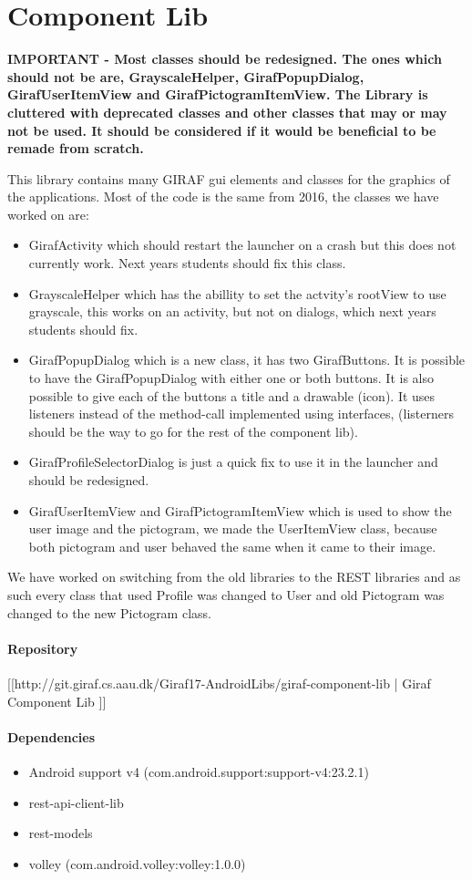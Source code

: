 \chapter{Component Lib}\label{WikiCompLib}
\textbf{IMPORTANT - Most classes should be redesigned. The ones which should not
be are, GrayscaleHelper, GirafPopupDialog, GirafUserItemView and
GirafPictogramItemView. The Library is cluttered with deprecated classes and
other classes that may or may not be used. It should be considered if it would
be beneficial to be remade from scratch.}

This library contains many GIRAF gui elements and classes for the graphics of
the applications. Most of the code is the same from 2016, the classes we have
worked on are:

\begin{itemize}
  \item GirafActivity which should restart the launcher on a crash but this
  does not currently work. Next years students should fix this class.
  \item GrayscaleHelper which has the abillity to set the actvity's rootView to
  use grayscale, this works on an activity, but not on dialogs,  which next
  years students should fix.
  \item GirafPopupDialog which is a new class, it has two GirafButtons. It is
  possible to have the GirafPopupDialog with either one or both buttons. It is
  also possible to give each of the buttons a title and a drawable (icon). It
  uses listeners instead of the method-call implemented using interfaces,
  (listerners should be the way to go for the rest of the component lib).
  \item GirafProfileSelectorDialog is just a quick fix to use it in the launcher
  and should be redesigned.
  \item GirafUserItemView and GirafPictogramItemView which is used to show the
  user image and the pictogram,  we made the UserItemView class, because both
  pictogram and user behaved the same when it came to their image.
  
\end{itemize}

We have worked on switching from the old libraries to the REST libraries and as
such every class that used Profile was changed to User and old Pictogram was
changed to the new Pictogram class.

\subsubsection{Repository}
[[http://git.giraf.cs.aau.dk/Giraf17-AndroidLibs/giraf-component-lib | Giraf Component Lib ]]

\subsubsection{Dependencies}
\begin{itemize}
  \item Android support v4 (com.android.support:support-v4:23.2.1)
  \item rest-api-client-lib
  \item rest-models
  \item volley (com.android.volley:volley:1.0.0)
\end{itemize}

